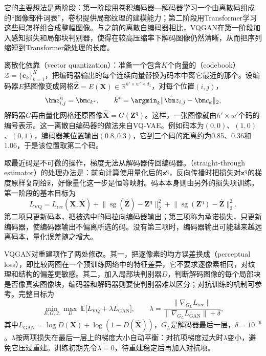 它的主要想法是两阶段：第一阶段用卷积编码器—解码器学习一个由离散码组成的“图像部件词表”，卷积提供局部纹理的建模能力；第二阶段用Transformer学习这些码怎样组合成整幅图像。与之前的离散自编码器相比，VQGAN在第一阶段加入感知损失和局部块判别器，使得在较高压缩率下解码图像仍然清晰，从而把序列缩短到Transformer能处理的长度。

离散化依靠（vector quantization）：准备一个包含$K$个向量的（codebook）$\mathcal Z=\{\bm c_k\}_{k=1}^{K}$，把编码器输出的每个连续向量替换为码本中离它最近的那个。设编码器$E$把图像变成网格$\hat{\bm Z}=E(\bm X)\in\mathbb R^{h'\times w'\times d_z}$，对每个位置$(i,j)$，
\begin{equation}
  \bm z^{\mathrm q}_{i,j}=\bm c_{k^\ast},\qquad
  k^\ast=\argmin_{k}\lVert\hat{\bm z}_{i,j}-\bm c_k\rVert_2,
  \label{eq:vision-ivm-vq}
\end{equation}
解码器$G$再由量化网格还原图像$\hat{\bm X}=G(\bm Z^{\mathrm q})$。这样，一张图像就由$h'\times w'$个码的编号表示。这一离散自编码器的做法来自VQ-VAE。例如码本为$(0,0)$、$(1,0)$、$(0,1)$，编码器某位置输出$(0.8,0.3)$，它到三个码的距离约为0.85、0.36和1.06，于是该位置取第二个码。

取最近码是不可微的操作，梯度无法从解码器传回编码器。（straight-through estimator）的处理办法是：前向计算使用量化后的$\bm z^{\mathrm q}$，反向传播时把损失对$\bm z^{\mathrm q}$的梯度原样复制给$\hat{\bm z}$，好像量化这一步是恒等映射。码本本身则由另外的损失项训练。第一阶段的基本目标为
\begin{equation}
  L_{\mathrm{VQ}}=L_{\mathrm{rec}}(\bm X,\hat{\bm X})
  +\lVert\operatorname{sg}(\hat{\bm Z})-\bm Z^{\mathrm q}\rVert_2^2
  +\lVert\operatorname{sg}(\bm Z^{\mathrm q})-\hat{\bm Z}\rVert_2^2.
  \label{eq:vision-ivm-vq-loss}
\end{equation}
第二项只更新码本，把被选中的码拉向编码器输出；第三项称为承诺损失，只更新编码器，使编码器输出不偏离所选的码。没有第三项时，编码器输出可能越来越远离码本，量化误差随之增大。

VQGAN对重建项作了两处修改。其一，把逐像素的均方误差换成（perceptual loss），即比较两图在一个预训练网络中的特征差异，它不要求逐像素相同，对纹理和结构的偏差更敏感。其二，加入局部块判别器$D$，判断解码图像的每个局部块是否像真实图像块，编码器和解码器则要使判别器难以区分；对抗训练的机制可参考。完整目标为
\begin{equation}
  \min_{E,G,\mathcal Z}\max_{D}\;
  \mathbb E\bigl[L_{\mathrm{VQ}}+\lambda L_{\mathrm{GAN}}\bigr],\qquad
  \lambda=\frac{\lVert\nabla_{G_L}L_{\mathrm{rec}}\rVert}
  {\lVert\nabla_{G_L}L_{\mathrm{GAN}}\rVert+\delta},
  \label{eq:vision-ivm-vqgan}
\end{equation}
其中$L_{\mathrm{GAN}}=\log D(\bm X)+\log(1-D(\hat{\bm X}))$，$G_L$是解码器最后一层，$\delta=10^{-6}$。$\lambda$按两项损失在最后一层上的梯度大小自动平衡：对抗项梯度过大时$\lambda$变小，避免它压过重建。训练初期先令$\lambda=0$，待重建稳定后再加入对抗项。

